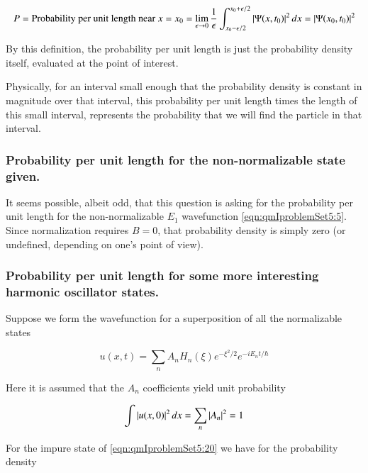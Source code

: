 \begin{equation}\label{eqn:qmIproblemSet5:17}
P = \text{Probability per unit length near $x = x_0$} =
\lim_{\epsilon \rightarrow 0} \frac{1}{\epsilon} \int_{x_0 - \epsilon/2}^{x_0 + \epsilon/2} \left\lvert{ \Psi(x, t_0) }\right\rvert^2 dx = \left\lvert{\Psi(x_0, t_0)}\right\rvert^2
\end{equation}

By this definition, the probability per unit length is just the probability density itself, evaluated at the point of interest.

Physically, for an interval small enough that the probability density is constant in magnitude over that interval, this probability per unit length times the length of this small interval, represents the probability that we will find the particle in that interval.

\subsubsection{Probability per unit length for the non-normalizable state given.}

It seems possible, albeit odd, that this question is asking for the probability per unit length for the non-normalizable $E_1$ wavefunction \ref{eqn:qmIproblemSet5:5}.  Since normalization requires $B=0$, that probability density is simply zero (or undefined, depending on one's point of view).

\subsubsection{Probability per unit length for some more interesting harmonic oscillator states.}

Suppose we form the wavefunction for a superposition of all the normalizable states

\begin{equation}\label{eqn:qmIproblemSet5:20}
u(x,t) = \sum_n A_n H_n(\xi) e^{-\xi^2/2} e^{-i E_n t/\hbar}
\end{equation}

Here it is assumed that the $A_n$ coefficients yield unit probability

\begin{equation}\label{eqn:qmIproblemSet5:30}
\int \left\lvert{u(x,0)}\right\rvert^2 dx = \sum_n \left\lvert{A_n}\right\rvert^2 = 1
\end{equation}

For the impure state of \ref{eqn:qmIproblemSet5:20} we have for the probability density

